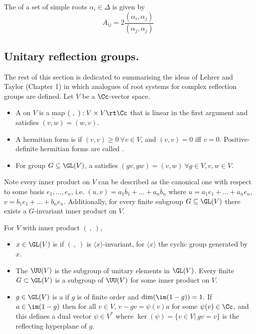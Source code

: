 \begin{definition} The  of a set of simple roots $\alpha_i\in \Delta$ is given by $$A_{ij}=2\frac{(\alpha_i,\alpha_j)}{(\alpha_j,\alpha_j)}$$
\end{definition}

\subsection{Unitary reflection groups.}
The rest of this section is dedicated to summarising the ideas of Lehrer and Taylor \cite{alma9930780234401631} (Chapter 1) in which analogues of root systems for complex reflection groups are defined. Let $V$ be a $\Cc$-vector space.

\begin{definition}\begin{itemize}
  \item A  on $V$ is a map $(\ ,\ ):V\times V\rt \Cc$ that is linear in the first argument and satisfies $\overline{(v,w)}=(w,v)$.
  
  \item A hermitian form is  if $(v,v)\geq 0\ \forall v\in V$, and $(v,v)=0$ iff $v=0$. Positive-definite hermitian forms are called .
  
  \item For group $G\subseteq \GL(V)$, a  satisfies $(gv,gw)=(v,w)\ \forall g\in V,v,w\in V$.
\end{itemize}
\end{definition}

\nt Note every inner product on $V$ can be described as the canonical one with respect to some basis $e_1,\dots,e_n$, i.e. $(u,v)=a_1\overline{b}_1+\dots +a_n \overline{b}_n$ where $u=a_1e_1+\dots +a_n e_n$, $v=b_1e_1+\dots+b_n e_n$. Additionally, for every finite subgroup $G\subseteq \GL(V)$ there exists a $G$-invariant inner product on $V$.\bb

\begin{definition} For $V$ with inner product $(\ ,\ )$,
\begin{itemize}
  \item $x\in \GL(V)$ is  if $(\ ,\ )$ is $\langle x\rangle$-invariant, for $\langle x\rangle$ the cyclic group generated by $x$.
  
  \item The  $\UU(V)$ is the subgroup of unitary elements in $\GL(V)$. Every finite $G\subset \GL(V)$ is a subgroup of $\UU(V)$ for some inner product on $V$.
  
  \item $g\in \GL(V)$ is a  if $g$ is of finite order and $\dim(\im(1-g))=1$. If $a\in \im(1-g)$ then for all $v\in V$, $v-gv=\psi(v)a$ for some $\psi(v)\in \Cc$, and this defines a dual vector $\psi\in V^*$ where $\ker(\psi)=\{v\in V|\ gv=v\}$ is the reflecting hyperplane of $g$. 
\end{itemize}
\end{definition}

